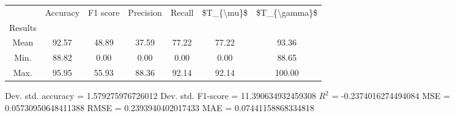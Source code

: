 \begin{tabular}{|c|c|c|c|c|c|c|}
\toprule
{} &  Accuracy &  F1 score &  Precision &  Recall &  \$T\_\{\textbackslash mu\}\$ &  \$T\_\{\textbackslash gamma\}\$ \\
Results &           &           &            &         &            &               \\
\hline
Mean    &     92.57 &     48.89 &      37.59 &   77.22 &      77.22 &         93.36 \\
Min.    &     88.82 &      0.00 &       0.00 &    0.00 &       0.00 &         88.65 \\
Max.    &     95.95 &     55.93 &      88.36 &   92.14 &      92.14 &        100.00 \\
\bottomrule
\end{tabular}

 Dev. std. accuracy = 1.579275976726012
 Dev. std. F1-score = 11.390634932459308
 $R^2$ = -0.2374016274494084
 MSE = 0.05730950648411388
 RMSE = 0.2393940402017433
 MAE = 0.07441158868334818